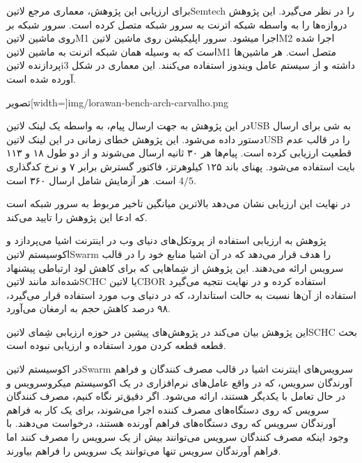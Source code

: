 برای ارزیابی این پژوهش، معماری مرجع ‌لاتین{Semtech} را در نظر می‌گیرد. این پژوهش دروازه‌ها را به واسطه شبکه اترنت به سرور شبکه متصل کرده است.
سرور شبکه بر روی ماشین ‌لاتین{M1} اجرا میشود. سرور اپلیکیشن روی ماشین ‌لاتین{M2} اجرا شده است که به وسیله همان شبکه اترنت به ماشین ‌لاتین{M1}
متصل است. هر ماشین‌ها پردازنده ‌لاتین{i3} داشته و از سیستم عامل ویندوز استفاده می‌کنند.
این معماری در شکل 
آورده شده است.

‌تصویر[width=\textwidth]{img/lorawan-bench-arch-carvalho.png}

در این پژوهش به جهت ارسال پیام، به واسطه یک لینک ‌لاتین{USB} به شی برای ارسال دستور داده می‌شود. این پژوهش خطای زمانی
در این لینک ‌لاتین{USB} را در قالب عدم قطعیت ارزیابی کرده است. پیام‌ها هر ۳۰ ثانیه ارسال می‌شوند و از دو طول ۱۸ و ۱۱۳ بایت استفاده می‌شود.
پهنای باند ۱۲۵ کیلوهرتز، فاکتور گسترش برابر ۷ و نرخ کدگذاری $4/5$ است.
هر آزمایش شامل ارسال ۳۶۰ است.

در نهایت این ارزیابی نشان می‌دهد بالاترین میانگین تاخیر مربوط به سرور شبکه است که ادعا این پژوهش را تایید می‌کند.


پژوهش  به ارزیابی استفاده از پروتکل‌های دنیای وب در اینترنت اشیا می‌پردازد و اکوسیستم ‌لاتین{Swarm} را هدف قرار می‌دهد که در آن اشیا
منابع خود را در قالب سرویس ارائه می‌دهند. این پژوهش از شِماهایی که برای کاهش لود ارتباطی پیشنهاد شده‌اند مانند ‌لاتین{SCHC} یا ‌لاتین{CBOR}
استفاده کرده و در نهایت نتجیه می‌گیرد استفاده از آن‌ها نسبت به حالت استاندارد، که در دنیای وب مورد استفاده قرار می‌گیرد، ۹۸ درصد کاهش حجم به ارمغان می‌آورد.

این پژوهش بیان می‌کند در پژوهش‌های پیشین در حوزه ارزیابی شِمای ‌لاتین{SCHC} بحث قطعه قطعه کردن مورد استفاده و ارزیابی نبوده است.

در اکوسیستم ‌لاتین{Swarm} سرویس‌های اینترنت اشیا در قالب مصرف کنندگان و فراهم آورندگان سرویس،
که در واقع عامل‌های نرم‌افزاری در یک اکوسیستم میکروسرویس و در حال تعامل با یکدیگر هستند،
ارائه می‌شود.
اگر دقیق‌تر نگاه کنیم، مصرف کنندگان سرویس که روی دستگاه‌های مصرف کننده اجرا می‌شوند، برای یک کار
به فراهم آورندگان سرویس که روی دستگاه‌های فراهم آورنده هستند، درخواست می‌دهند.
با وجود اینکه مصرف کنندگان سرویس می‌توانند بیش از یک سرویس را مصرف کنند اما فراهم آورندگان سرویس
تنها می‌توانند یک سرویس را فراهم بیاورند.

